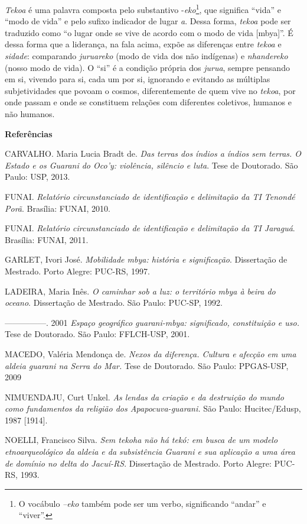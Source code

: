 \emph{Tekoa} é uma palavra composta pelo substantivo
-\emph{eko}\footnote{O vocábulo \emph{--eko} também pode ser um verbo,
  significando ``andar'' e ``viver''.}, que significa ``vida'' e ``modo
de vida'' e pelo sufixo indicador de lugar \emph{a}. Dessa forma,
\emph{tekoa} pode ser traduzido como ``o lugar onde se vive de acordo
com o modo de vida {[}mbya{]}''. É dessa forma que a liderança, na fala
acima, expõe as diferenças entre \emph{tekoa} e \emph{sidade}:
comparando \emph{juruareko} (modo de vida dos não indígenas) e
\emph{nhandereko} (nosso modo de vida). O ``si'' é a condição própria
dos \emph{jurua}, sempre pensando em si, vivendo para si, cada um por
si, ignorando e evitando as múltiplas subjetividades que povoam o
cosmos, diferentemente de quem vive no \emph{tekoa}, por onde passam e
onde se constituem relações com diferentes coletivos, humanos e não
humanos.

\textbf{Referências }

CARVALHO. Maria Lucia Bradt de. \emph{Das terras dos índios a índios sem
terras. O Estado e os Guarani do Oco'y: violência, silêncio e luta}.
Tese de Doutorado. São Paulo: USP, 2013.

FUNAI. \emph{Relatório circunstanciado de identificação e delimitação da
TI Tenondé Porã}. Brasília: FUNAI, 2010.

FUNAI. \emph{Relatório circunstanciado de identificação e delimitação da
TI Jaraguá}. Brasília: FUNAI, 2011.

GARLET, Ivori José. \emph{Mobilidade mbya: história e significação}.
Dissertação de Mestrado. Porto Alegre: PUC-RS, 1997.

LADEIRA, Maria Inês. \emph{O caminhar sob a luz: o território mbya à
beira do oceano}. Dissertação de Mestrado. São Paulo: PUC-SP, 1992.

---------------. 2001 \emph{Espaço geográfico guarani-mbya: significado,
constituição e uso.} Tese de Doutorado. São Paulo: FFLCH-USP, 2001.

MACEDO, Valéria Mendonça de. \emph{Nexos da diferença. Cultura e afecção
em uma aldeia guarani na Serra do Mar.} Tese de Doutorado. São Paulo:
PPGAS-USP, 2009

NIMUENDAJU, Curt Unkel. \emph{As lendas da criação e da destruição do
mundo como fundamentos da religião dos Apapocuva-guarani.} São Paulo:
Hucitec/Edusp, 1987 {[}1914{]}.

NOELLI, Francisco Silva. \emph{Sem tekoha não há tekó: em busca de um
modelo etnoarqueológico da aldeia e da subsistência Guarani e sua
aplicação a uma área de domínio no delta do Jacuí-RS}. Dissertação de
Mestrado. Porto Alegre: PUC-RS, 1993.

